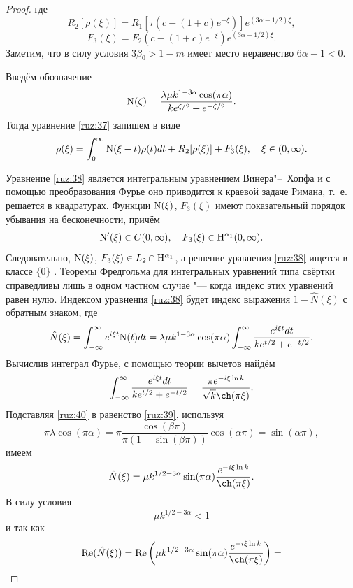 \begin{proof}
\noindent
где
$$R_2[\rho(\xi)]=R_1[\tau(c-(1+c)e^{-\xi})]e^{(3\alpha-1/2)\xi},$$
$$F_3(\xi)=F_2(c-(1+c){e^{-\xi}}){e^{(3\alpha-1/2)\xi}}.$$
Заметим, что в силу условия $3\beta_0>{1-m}$ имеет место неравенство $6\alpha-{1}<0$.

Введём обозначение  
$${\rm N}(\zeta)=\frac{\lambda\mu k^{1-3\alpha}\cos(\pi\alpha)}{ke^{\zeta/2}+e^{-\zeta/2}}.$$
Тогда  уравнение \eqref{ruz:37} запишем в виде
\begin{equation}
\rho(\xi)=\int_0^\infty{{\rm N}(\xi-t)\rho(t)dt}+R_2[\rho(\xi)]+F_3(\xi),\quad \xi\in(0,\infty ). 
\label{ruz:38}
\end{equation}

Уравнение \eqref{ruz:38} является  интегральным  уравнением Винера"--~Хопфа \cite[с.~55]{ruz:bib:12}
и с помощью преобразования Фурье оно приводится к краевой задаче Римана, т.~е. решается в квадратурах.
Функции ${\rm N}(\xi)$, $F_3(\xi)$ имеют показательный порядок убывания на бесконечности, причём
$${\rm N}'(\xi)\in C(0, \infty),\quad  F_3(\xi)\in {{\rm H}^{{\alpha _1}}}(0,\infty ).$$
Следовательно, ${\rm N}(\xi )$, ${F_3}(\xi ) \in {L_2} \cap {{\rm H}^{{\alpha _1}}}$,
а решение уравнения \eqref{ruz:38} ищется в классе $\{0\}$ \cite[с.~12]{ruz:bib:12}.
Теоремы Фредгольма для интегральных уравнений типа свёртки справедливы лишь в одном частном случае "--- когда индекс
этих уравнений равен нулю.
Индексом уравнения \eqref{ruz:38} будет индекс выражения \mbox{$1-\hat N(\xi)$} с обратным знаком,
где
\begin{equation}
\hat N (\xi)=\int_{-\infty}^\infty{e^{i\xi t}{\rm N}(t)dt}=\lambda\mu k^{1-3\alpha}\cos(\pi\alpha)\int_{-\infty}^\infty{\frac{e^{i\xi t}dt}{ke^{t/2}+e^{-t/2}}}.
\label{ruz:39}
\end{equation}
Вычислив интеграл Фурье, с помощью теории вычетов \cite[с.~198]{ruz:bib:9} найдём
\begin{equation}
\int_{-\infty}^\infty{\frac{e^{i\xi t}dt}{ke^{t/2}+e^{-t/2}}}=\frac{\pi e^{-i\xi\ln k}}{\sqrt k \ch(\pi\xi)}.
\label{ruz:40}
\end{equation}
Подставляя \eqref{ruz:40} в  равенство \eqref{ruz:39}, используя
$$\pi\lambda\cos(\pi\alpha)=\pi\frac{\cos(\beta\pi)}{\pi(1+\sin(\beta\pi))}\cos(\alpha\pi)=\sin(\alpha\pi),$$
имеем
$$ \hat N (\xi)=\mu k^{{1}/{2}-3\alpha}\sin(\pi\alpha)\frac{e^{-i\xi\ln k}}{\ch(\pi\xi)}.$$
В силу условия
$$\mu k^{{1}/{2}-3\alpha}<1$$ 
и так как
\begin{multline*}
\mathop{\rm Re}(\hat N(\xi))=\mathop{\rm Re}\left(\mu k^{{1}/{2}-3\alpha}\sin(\pi\alpha)\frac{e^{-i\xi\ln k}}{\ch(\pi\xi)}\right)=

\end{multline*}
\end{proof}
